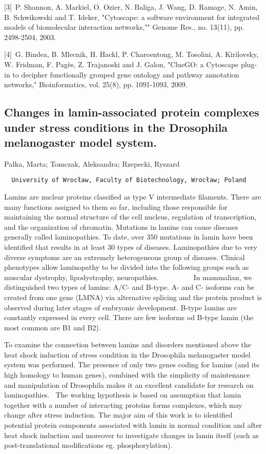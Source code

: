 {[3] P. Shannon, A. Markiel, O. Ozier, N. Baliga, J. Wang, D. Ramage, N. Amin, B. Schwikowski and T. Ideker, "Cytoscape: a software environment for integrated models of biomolecular interaction networks,"" Genome Res., no. 13(11), pp. 2498-2504, 2003.

[4] G. Bindea, B. Mlecnik, H. Hackl, P. Charoentong, M. Tosolini, A. Kirilovsky, W. Fridman, F. Pagès, Z. Trajanoski and J. Galon, "ClueGO: a Cytoscape plug-in to decipher functionally grouped gene ontology and pathway annotation networks," Bioinformatics, vol. 25(8), pp. 1091-1093, 2009.

\pagebreak
\subsection*{\color{eubicRed} Changes in lamin-associated protein complexes under stress conditions in the Drosophila melanogaster model system.}
{\color{eubicGray}Pałka, Marta;
Tomczak, Aleksandra;
Rzepecki, Ryszard}
{\color{eubicGray}\begin{verbatim}
  University of Wrocław, Faculty of Biotechnology, Wrocław; Poland
\end{verbatim}}

Lamins are nuclear proteins classified as type V intermediate filaments. There are many functions assigned to them so far, including those responsible for maintaining the normal structure of the cell nucleus, regulation of transcription, and the organization of chromatin. Mutations in lamins can cause diseases generally called laminopathies. To date, over 350 mutations in lamin have been identified that results in at least 30 types of diseases. Laminopathies due to very diverse symptoms are an extremely heterogeneous group of diseases. Clinical phenotypes allow laminopathy to be divided into the following groups such as muscular dystrophy, lipodystrophy, neuropathies.          In mammalian, we distinguished two types of lamins: A/C- and B-type. A- and C- isoforms can be created from one gene (LMNA) via alternative splicing and the protein product is observed during later stages of embryonic development. B-type lamins are constantly expressed in every cell. There are few isoforms od B-type lamin (the most common are B1 and B2).

To examine the connection between lamins and disorders mentioned above the heat shock induction of stress condition in the Drosophila melanogaster model system was performed. The presence of only two genes coding for lamins (and its high homology to human genes), combined with the simplicity of maintenance and manipulation of Drosophila makes it an excellent candidate for research on laminopathies.  The working hypothesis is based on assumption that lamin together with a number of interacting proteins forms complexes, which may change after stress induction. The major aim of this work is to identified potential protein components associated with lamin in normal condition and after heat shock induction and moreover to investigate changes in lamin itself (such as post-translational modifications eg. phosphorylation).

}
